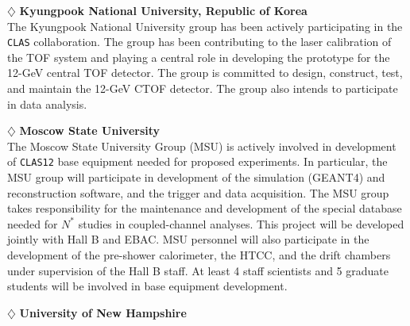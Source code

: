 \vskip 0.4cm

\noindent
$\diamondsuit$ {\bf Kyungpook National University, Republic of Korea} \\[0.2ex]

\noindent
The Kyungpook National University group has been actively participating
in the {\tt CLAS} collaboration. The group has been contributing to the laser
calibration of the TOF system and playing a central role in developing 
the prototype for the 12-GeV central TOF detector.  The group is committed to 
design, construct, test, and maintain the 12-GeV  CTOF detector.  The group 
also intends to participate in data analysis.

\vskip 0.4cm

\noindent
$\diamondsuit$ {\bf Moscow State University} \\[0.2ex]

\noindent
The Moscow State University Group (MSU) is actively involved in development 
of {\tt CLAS12} base equipment needed for proposed experiments.  In 
particular, the MSU group will participate in development of the simulation
(GEANT4) and reconstruction software, and the trigger and data acquisition.
The MSU group takes responsibility for the maintenance and development of 
the special database needed for $N^*$ studies in coupled-channel analyses. 
This project will be developed jointly with Hall B and EBAC.  MSU personnel 
will also participate in the development of the pre-shower calorimeter, the 
HTCC, and the drift chambers under supervision of the Hall B staff.  At 
least 4 staff scientists and 5 graduate students will be involved in base 
equipment development.

\vskip 0.4cm

\noindent
$\diamondsuit$ {\bf University of New Hampshire} \\[0.2ex]

